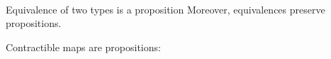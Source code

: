 \begin{code}
\AgdaSymbol{)}\AgdaSpace{}%
\AgdaSpace{}%
\AgdaSpace{}%
\<%
\\
%
\>[8]\AgdaSpace{}%
\AgdaSpace{}%
\AgdaSymbol{=}\AgdaSpace{}%
\AgdaSpace{}%
\AgdaSpace{}%
\AgdaSpace{}%
\AgdaSpace{}%
\AgdaSymbol{(}\AgdaOperator{\AgdaFunction{!}}\AgdaSpace{}%
\AgdaSpace{}%
\AgdaSymbol{(}\AgdaSpace{}%
\AgdaSymbol{)}\AgdaSpace{}%
\AgdaSymbol{)}\AgdaSpace{}%
\AgdaSpace{}%
\AgdaSymbol{(}\AgdaSpace{}%
\AgdaSymbol{(}\AgdaSpace{}%
\AgdaSymbol{)}\AgdaSpace{}%
\AgdaSymbol{)}\<%
\end{code}


Equivalence of two types is a proposition
Moreover, equivalences preserve propositions.



Contractible maps are propositions:

\begin{code}%
%
\>[2]\<%
\\
\>[2][@{}l@{\AgdaIndent{0}}]%
\>[4]\AgdaSymbol{:}\AgdaSpace{}%
\AgdaSymbol{\{}\AgdaSpace{}%
\AgdaSymbol{:}\AgdaSpace{}%
\AgdaSpace{}%
\AgdaSymbol{\}}\AgdaSpace{}%
\AgdaSymbol{\{}\AgdaSpace{}%
\AgdaSymbol{:}\AgdaSpace{}%
\AgdaSpace{}%
\AgdaSymbol{\}}\<%
\\
%
\>[4]\AgdaSpace{}%
\AgdaSymbol{(}\AgdaSpace{}%
\AgdaSymbol{:}\AgdaSpace{}%
\AgdaSpace{}%
\AgdaSpace{}%
\AgdaSymbol{)}\<%
\\
%
\>[4]\AgdaComment{-------------}\<%
\\
%
\>[4]\AgdaSpace{}%
\AgdaSpace{}%
\AgdaSymbol{(}\AgdaSpace{}%
\AgdaSymbol{)}\<%
\\
%
\\[\AgdaEmptyExtraSkip]%
%
\>[2]\AgdaSpace{}%
\AgdaSpace{}%
\AgdaSymbol{=}\AgdaSpace{}%
\AgdaSpace{}%
\AgdaSpace{}%
\AgdaSpace{}%
\AgdaSpace{}%
\AgdaSymbol{)}\<%
\end{code}

